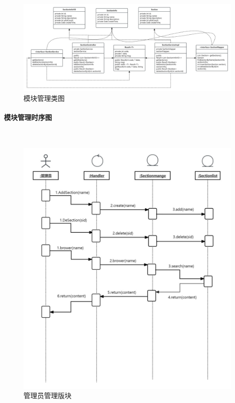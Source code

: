 \documentclass[UTF8]{ctexart}
\newcommand{\subsubsubsection}[1]{\paragraph{#1}\mbox{}\\} %
\begin{document}
\begin{figure}[H]
  \centering
  \includegraphics[scale=0.2]{精化类模型图/section.jpg}
  \caption{模块管理类图}
\end{figure}

\subsubsubsection{模块管理时序图}

\begin{figure}[H]
  \centering
  \includegraphics[scale=0.3]{顺序图/管理员版块管理.png}
  \caption{管理员管理版块}
\end{figure}



\newpage
\end{document}
